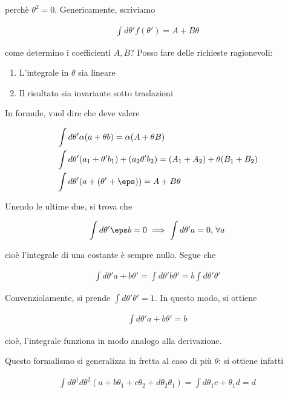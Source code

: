 \documentclass{report}
\begin{document}
perchè \(\theta^2 = 0\). Genericamente, scriviamo 

\begin{align}
    \int d\theta' f(\theta') = A + B\theta
\end{align}

come determino i coefficienti \(A, B\)? Posso fare delle richieste ragionevoli: 

\begin{enumerate}
    \item L'integrale in \(\theta\) sia lineare
    \item Il risultato sia invariante sotto traslazioni
\end{enumerate}

In formule, vuol dire che deve valere 

\begin{align}
    &\int d\theta' \alpha (a+\theta b) = \alpha (A+\theta B) \notag \\ 
    &\int d\theta' (a_1 + \theta'b_1) + (a_2 \theta' b_2) = (A_1 + A_2) + \theta(B_1 + B_2) \notag \\ 
    &\int d\theta' (a + (\theta'+\eps)) = A +B\theta
\end{align}

Unendo le ultime due, si trova che 

\begin{align}
    \int d\theta' \eps b = 0 \implies \int d\theta ' a = 0, \, \forall a
\end{align}

cioè l'integrale di una costante è sempre nullo. Segue che 

\begin{align}
    \int d\theta' a + b\theta' = \int d\theta' b \theta' = b \int d\theta' \theta'
\end{align}

Convenziolamente, si prende \(\int d\theta' \theta' = 1\). In questo modo, si ottiene 

\begin{align}
    \int d\theta' a + b\theta' = b
\end{align}

cioè, l'integrale funziona in modo analogo alla derivazione. 

Questo formalismo si generalizza in fretta al caso di più \(\theta\): si ottiene infatti 

\begin{align}
    \int d\theta^1 d\theta^2 (a + b\theta_1 + c\theta_2 + d\theta_2 \theta_1) = \int d\theta_1 c + \theta_1 d = d 
\end{align}
\end{document}
